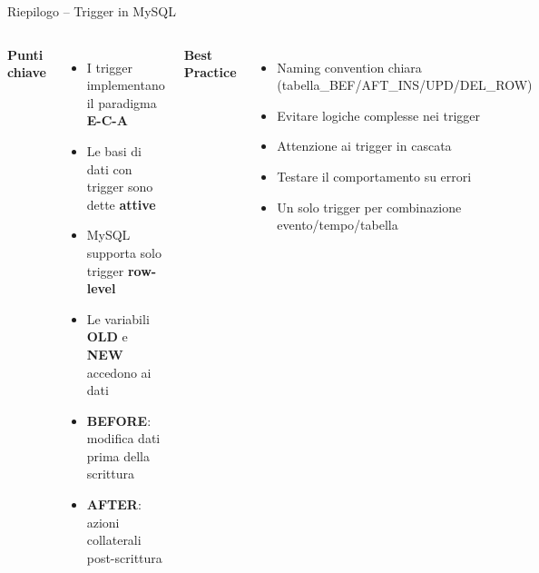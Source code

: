 \documentclass[aspectratio=169]{beamer}
\begin{document}
\begin{frame}{Riepilogo -- Trigger in MySQL}
  \begin{columns}[T]
      \textbf{Punti chiave}
      \begin{itemize}
        \item I trigger implementano il paradigma \textbf{E-C-A}
        \item Le basi di dati con trigger sono dette \textbf{attive}
        \item MySQL supporta solo trigger \textbf{row-level}
        \item Le variabili \textbf{OLD} e \textbf{NEW} accedono ai dati
        \item \textbf{BEFORE}: modifica dati prima della scrittura
        \item \textbf{AFTER}: azioni collaterali post-scrittura
      \end{itemize}
      \textbf{Best Practice}
      \begin{itemize}
        \item Naming convention chiara (tabella\_BEF/AFT\_INS/UPD/DEL\_ROW)
        \item Evitare logiche complesse nei trigger
        \item Attenzione ai trigger in cascata
        \item Testare il comportamento su errori
        \item Un solo trigger per combinazione evento/tempo/tabella
      \end{itemize}
  \end{columns}
  \vspace{0.4cm}
  \begin{center}
  \end{center}
\end{frame}
\end{document}

